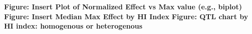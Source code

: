 \textbf{Figure: Insert Plot of Normalized Effect vs Max value (e.g., biplot)}
\textbf{Figure: Insert Median Max Effect by HI Index}
\textbf{Figure: QTL chart by HI index: homogenous or heterogenous}




